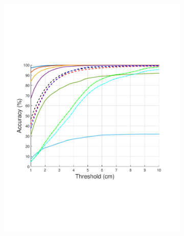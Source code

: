\begin{figure}[t]
\begin{subfigure}{0.245\textwidth}
		\includegraphics[trim=40 180 60 		170,clip,width=\textwidth]{figures/0822_quant_noLegend/PCK-Threshold-three-people.pdf}
	\end{subfigure}
	\begin{subfigure}{0.245\textwidth}


\end{subfigure}
\end{figure}
